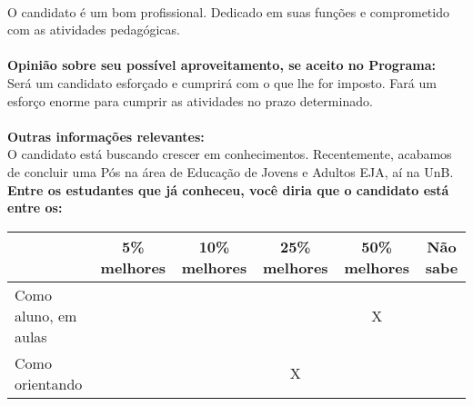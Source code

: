 \documentclass[11pt]{article}
\begin{document}
\\O candidato é um bom profissional. Dedicado em suas funções e comprometido com as atividades pedagógicas.\\
\\
\textbf{Opinião sobre seu possível aproveitamento, se aceito no Programa:}
\\Será um candidato esforçado e cumprirá com o que lhe for imposto. Fará um esforço enorme para cumprir as atividades no prazo determinado.\\ 
\\
\textbf{Outras informações relevantes:} \\O candidato está buscando crescer em conhecimentos. Recentemente, acabamos de concluir uma Pós na área de Educação de Jovens e Adultos EJA, aí na UnB.
\\[0.3cm]
\textbf{Entre os estudantes que já conheceu, você diria que o candidato está entre os:}
\\
\begin{tabular}{|l|c|c|c|c|c|}
\hline
 & 5\% melhores & 10\% melhores & 25\% melhores & 50\% melhores & Não sabe \\
\hline
Como aluno, em aulas &  &  &  & X & \\
\hline
Como orientando &  &  & X &  & \\
\hline
\end{tabular}
\end{document}
